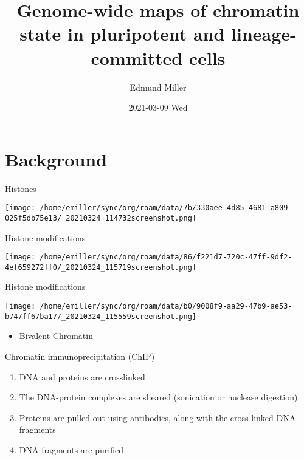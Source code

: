 \documentclass[bigger]{beamer}
\author{Edmund Miller}
\date{2021-03-09 Wed}
\title{Genome-wide maps of chromatin state in pluripotent and lineage-committed cells}
\begin{document}
\maketitle

\section{Background}
\label{sec:org49fde6a}

\begin{frame}[label={sec:org34e898f}]{Histones}
\begin{center}
\texttt{[image: /home/emiller/sync/org/roam/data/7b/330aee-4d85-4681-a809-025f5db75e13/\_20210324\_114732screenshot.png]}
\end{center}
\end{frame}

\begin{frame}[label={sec:orgffa065f}]{Histone modifications}
\begin{center}
\texttt{[image: /home/emiller/sync/org/roam/data/86/f221d7-720c-47ff-9df2-4ef659272ff0/\_20210324\_115719screenshot.png]}
\end{center}
\end{frame}


\begin{frame}[label={sec:org70117aa}]{Histone modifications}
\begin{center}
\texttt{[image: /home/emiller/sync/org/roam/data/b0/9008f9-aa29-47b9-ae53-b747ff67ba17/\_20210324\_115559screenshot.png]}
\end{center}

\begin{itemize}
\item Bivalent Chromatin
\end{itemize}
\end{frame}

\begin{frame}[label={sec:org9917a63}]{Chromatin immunoprecipitation (ChIP)}
\begin{enumerate}
\item DNA and proteins are crosslinked
\item The DNA-protein complexes are sheared (sonication or nuclease digestion)
\item Proteins are pulled out using antibodies, along with the cross-linked DNA fragments
\item DNA fragments are purified
\end{enumerate}
\end{frame}
\end{document}
